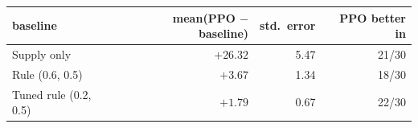 \begin{tabular}{lrrr}
\toprule
baseline & mean(PPO $-$ baseline) & std.\ error & PPO better in \\
\midrule
Supply only & $+26.32$ & 5.47 & 21/30 \\
Rule (0.6, 0.5) & $+3.67$ & 1.34 & 18/30 \\
Tuned rule (0.2, 0.5) & $+1.79$ & 0.67 & 22/30 \\
\bottomrule
\end{tabular}
